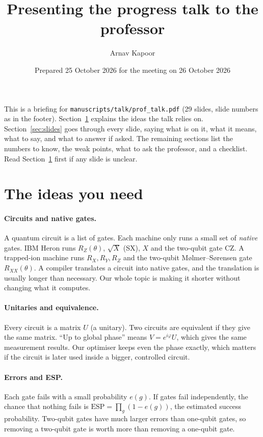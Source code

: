 \documentclass[11pt,a4paper]{article}
\title{\color{ibar}\bfseries Presenting the progress talk to the professor}
\author{Arnav Kapoor}
\date{Prepared 25 October 2026 for the meeting on 26 October 2026}
\begin{document}
\sloppy
\maketitle
\vspace{-1em}

\noindent This is a briefing for \texttt{manuscripts/talk/prof\_talk.pdf} (29 slides, slide numbers as in the footer).
Section~\ref{sec:primer} explains the ideas the talk relies on. Section~\ref{sec:slides} goes through every slide, saying
what is on it, what it means, what to say, and what to answer if asked. The remaining sections list the numbers to know,
the weak points, what to ask the professor, and a checklist. Read Section~\ref{sec:primer} first if any slide is unclear.

\section{The ideas you need}\label{sec:primer}

\paragraph{Circuits and native gates.} A quantum circuit is a list of gates. Each machine only runs a small set of
\emph{native} gates. IBM Heron runs $R_Z(\theta)$, $\sqrt X$ (SX), $X$ and the two-qubit gate CZ. A trapped-ion machine
runs $R_X,R_Y,R_Z$ and the two-qubit M{\o}lmer--S{\o}rensen gate $R_{XX}(\theta)$. A compiler translates a circuit into
native gates, and the translation is usually longer than necessary. Our whole topic is making it shorter without
changing what it computes.

\paragraph{Unitaries and equivalence.} Every circuit is a matrix $U$ (a unitary). Two circuits are equivalent if they
give the same matrix. ``Up to global phase'' means $V=e^{i\varphi}U$, which gives the same measurement results. Our
optimiser keeps even the phase exactly, which matters if the circuit is later used inside a bigger, controlled circuit.

\paragraph{Errors and ESP.} Each gate fails with a small probability $e(g)$. If gates fail independently, the chance
that nothing fails is $\text{ESP}=\prod_g(1-e(g))$, the estimated success probability. Two-qubit gates have much larger
errors than one-qubit gates, so removing a two-qubit gate is worth more than removing a one-qubit gate.
\end{document}
